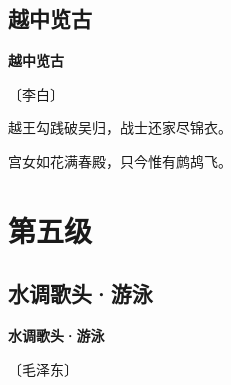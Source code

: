 \documentclass[12pt,UTF-8,openany,fontset=none]{ctexbook}
\begin{document}
\section{越中览古}


\begin{center}
    {\bfseries 越中览古}

    \vspace{18pt}

    \begin{large}\xuwen
        〔李白〕
    \end{large}

\end{center}

    \vspace{18pt}  %

\begin{center}
    \begin{Large}

        越王勾践破吴归，战士还家尽锦衣。

        宫女如花满春殿，只今惟有鹧鸪飞。

    \end{Large}

\end{center}

\vspace{8pt}
\clearpage

\chapter{第五级}
\clearpage

\section{水调歌头·游泳}


\begin{center}
    {\bfseries 水调歌头·游泳}

    \vspace{18pt}

    \begin{large}\xuwen
        〔毛泽东〕
    \end{large}

\end{center}

    \vspace{18pt}  %
\end{document}
